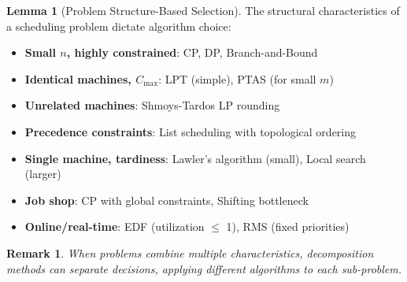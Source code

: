 \documentclass{article}
\newtheorem{remark}{Remark}
\theoremstyle{definition}
\newtheorem{lemma}{Lemma}
\begin{document}
\begin{lemma}[Problem Structure-Based Selection]
The structural characteristics of a scheduling problem dictate algorithm choice:

\begin{itemize}
    \item \textbf{Small $n$, highly constrained}: CP, DP, Branch-and-Bound
    \item \textbf{Identical machines, $C_{\max}$}: LPT (simple), PTAS (for small $m$)
    \item \textbf{Unrelated machines}: Shmoys-Tardos LP rounding
    \item \textbf{Precedence constraints}: List scheduling with topological ordering
    \item \textbf{Single machine, tardiness}: Lawler's algorithm (small), Local search (larger)
    \item \textbf{Job shop}: CP with global constraints, Shifting bottleneck
    \item \textbf{Online/real-time}: EDF (utilization $\leq$ 1), RMS (fixed priorities)
\end{itemize}

\begin{remark}
When problems combine multiple characteristics, decomposition methods can separate decisions, applying different algorithms to each sub-problem.
\end{remark}
\end{lemma}
\end{document}
